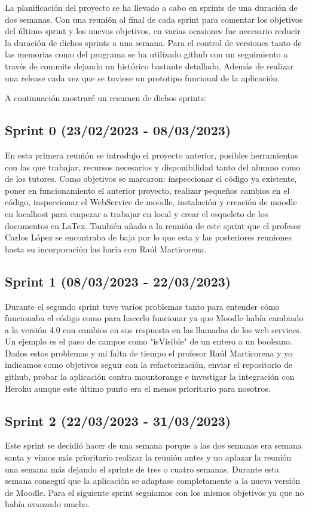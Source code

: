 La planificación del proyecto se ha llevado a cabo en sprints de una duración de dos semanas. Con una reunión al final de cada sprint para comentar los objetivos del último sprint y los nuevos objetivos, en varias ocasiones fue necesario reducir la duración de dichos sprints a una semana. Para el control de versiones tanto de las memorias como del programa se ha utilizado github con un seguimiento a través de commits dejando un histórico bastante detallado. Además de realizar una release cada vez que se tuviese un prototipo funcional de la aplicación.

A continuación mostraré un resumen de dichos sprints:

\subsection{Sprint 0 (23/02/2023 - 08/03/2023)}
	En esta primera reunión se introdujo el proyecto anterior, posibles herramientas con las que trabajar, recursos necesarios y disponibilidad tanto del alumno como de los tutores. Como objetivos se marcaron: inspeccionar el código ya existente, poner en funcionamiento el anterior proyecto, realizar pequeños cambios en el código, inspeccionar el WebService de moodle, instalación y creación de moodle en localhost para empezar a trabajar en local y crear el esqueleto de los documentos en LaTex.
    También añado a la reunión de este sprint que el profesor Carlos López se encontraba de baja por lo que esta y las posteriores reuniones hasta su incorporación las haría con Raúl Marticorena.

\subsection{Sprint 1 (08/03/2023 - 22/03/2023)}
	Durante el segundo sprint tuve varios problemas tanto para entender cómo funcionaba el código como para hacerlo funcionar ya que Moodle había cambiado a la versión 4.0 con cambios en sus respuesta en las llamadas de los web services. Un ejemplo es el paso de campos como "isVisible" de un entero a un booleano. Dados estos problemas y mi falta de tiempo el profesor Raúl Marticorena y yo indicamos como objetivos seguir con la refactorización, enviar el repositorio de github, probar la aplicación contra mountorange e investigar la integración con Heroku aunque este último punto era el menos prioritario para nosotros.

\subsection{Sprint 2 (22/03/2023 - 31/03/2023)}
	Este sprint se decidió hacer de una semana porque a las dos semanas era semana santa y vimos más prioritario realizar la reunión antes y no aplazar la reunión una semana más dejando el sprinte de tres o cuatro semanas. Durante esta semana conseguí que la aplicación se adaptase completamente a la nueva versión de Moodle. Para el siguiente sprint seguiamos con los mismos objetivos ya que no había avanzado mucho.

